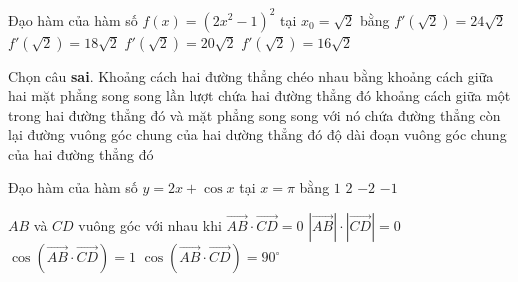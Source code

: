 \begin{ex}%
	Đạo hàm của hàm số $f(x)=(2x^2-1)^2$ tại $x_0=\sqrt{2}$ bằng
	\choice
	{\True $f'(\sqrt{2})=24\sqrt{2}$}
	{ $f'(\sqrt{2})=18\sqrt{2} $}
	{ $f'(\sqrt{2})=20\sqrt{2} $}
	{ $f'(\sqrt{2})=16\sqrt{2} $}
\end{ex}

\begin{ex}%
	Chọn câu {\bf sai}. Khoảng cách hai đường thẳng chéo nhau bằng
	\choice
	{khoảng cách giữa hai mặt phẳng song song lần lượt chứa hai đường thẳng đó}
	{ khoảng cách giữa một trong hai đường thẳng đó và mặt phẳng song song với nó chứa đường thẳng còn lại}
	{\True đường vuông góc chung của hai dường thẳng đó}
	{độ dài đoạn vuông góc chung của hai đường thẳng đó}
	\loigiai{
		
	} 
\end{ex}

\begin{ex}%
	Đạo hàm của hàm số $y=2x+\cos x$ tại $x=\pi$ bằng
	\choice
	{$1$}
	{\True $2$}
	{ $-2$}
	{$-1$}
\end{ex}

\begin{ex}%
	 $ AB $ và $ CD $ vuông góc với nhau khi
	\choice
	{\True $\overrightarrow{AB}\cdot\overrightarrow{CD} = 0$}
	{$|\overrightarrow{AB}|\cdot|\overrightarrow{CD} |= 0$}
	{$\cos (\overrightarrow{AB}\cdot\overrightarrow{CD}) = 1$}
	{$\cos(\overrightarrow{AB}\cdot\overrightarrow{CD}) = 90^\circ $}
\end{ex}


